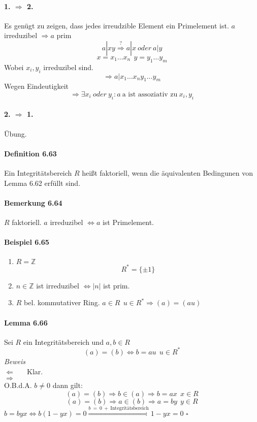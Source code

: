 \documentclass{scrartcl}
\begin{document}
\paragraph{1. $\Rightarrow$ 2.} 
Es genügt zu zeigen, dass jedes irreudzible Element ein Primelement ist.
$a$ irreduzibel $\Rightarrow a$ prim
\[
  a|xy \overset{?}{\Rightarrow} a|x ~oder~ a|y
\]
\[
  x = x_1 \dots x_n ~~ y = y_1 \dots y_m
\]
Wobei $x_i,y_i$ irreduzibel sind.
\[
  \Rightarrow a|x_1 \dots x_n y_1 \dots y_m
\]
Wegen Eindeutigkeit
\[
  \Rightarrow \exists x_i ~oder~ y_i: a ~\text{a ist assoziativ zu}~x_i,y_i
\]
\paragraph{2. $\Rightarrow$ 1.}
Übung.

\paragraph{Definition 6.63}
Ein Integritätsbereich $R$ heißt faktoriell, wenn die äquivalenten Bedingunen
von Lemma 6.62 erfüllt sind.

\paragraph{Bemerkung 6.64}
$R$ faktoriell. $a$ irreduzibel $\Leftrightarrow a$ ist Primelement. 

\paragraph{Beispiel 6.65}
\begin{enumerate}
\item $R = \mathbb{Z}$
  \[
    R^* = \{ \pm 1\}
  \]
\item $ n \in \mathbb{Z}$ ist irreduzibel $\Leftrightarrow |n|$ ist prim.
\item $R$ bel. kommutativer Ring. $a \in R ~~ u \in R^* \Rightarrow (a) = (au)$
\end{enumerate}

\paragraph{Lemma 6.66}
Sei $R$ ein Integritätsbereich und $a,b \in R$
\[
  (a) = (b) \Leftrightarrow b = au ~~ u \in R^*
\]
\textit{Beweis} \\
\grqq $\Leftarrow$ \grqq ~~ Klar. \\
\grqq $\Rightarrow$ \grqq \\
O.B.d.A. $b \neq 0$ dann gilt:
\[
  (a) = (b) \Rightarrow b \in (a) \Rightarrow b = ax ~~ x \in R
\]
\[
  (a) = (b) \Rightarrow a \in (b) \Rightarrow a = by ~~ y \in R
\]
$b = byx \Leftrightarrow b(1 - yx) = 0 \overset{b~=~0~+
  ~\text{Integritätsbereich}}{\Rightarrow} 1 - yx = 0$
\hfill $\square$
\end{document}
